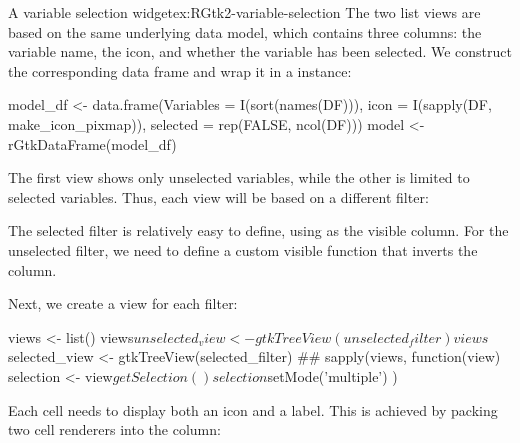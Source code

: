 \begin{example}{A variable selection widget}{ex:RGtk2-variable-selection}
The two list views are based on the same underlying data model, which
contains three columns: the variable name, the icon, and whether the
variable has been selected. We construct the corresponding data frame
and wrap it in a  instance:
\begin{Schunk}
\begin{Sinput}
 model_df <- data.frame(Variables = I(sort(names(DF))),
                        icon = I(sapply(DF, make_icon_pixmap)),
                        selected = rep(FALSE, ncol(DF)))
 model <- rGtkDataFrame(model_df)
\end{Sinput}
\end{Schunk}

The first view shows only unselected variables, while the other is
limited to selected variables. Thus, each view will be based on a
different filter:
\begin{Schunk}
\end{Schunk}
%
The selected filter is relatively easy to define, using
 as the visible column. For the unselected filter, we
need to define a custom visible function that inverts the
 column.

Next, we create a view for each filter:
\begin{Schunk}
\begin{Sinput}
 views <- list()
 views$unselected_view <- gtkTreeView(unselected_filter)
 views$selected_view <- gtkTreeView(selected_filter)
 ##
 sapply(views, function(view) {
   selection <- view$getSelection()
   selection$setMode('multiple')
 })
\end{Sinput}
\end{Schunk}

Each cell needs to display both an icon and a label.  This is achieved
by packing two cell renderers into the column:
\begin{Schunk}
\end{Schunk}


\end{example}
